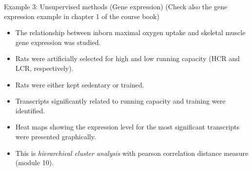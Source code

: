 \documentclass[
  10pt,
  ignorenonframetext,
]{beamer}
\providecommand{\tightlist}{%
  \setlength{\itemsep}{0pt}\setlength{\parskip}{0pt}}
\begin{document}
\begin{frame}{Example 3: Unsupervised methods (Gene expression)}
\protect\hypertarget{example-3-unsupervised-methods-gene-expression}{}
(Check also the gene expression example in chapter 1 of the course book)

\vspace{2mm}

\begin{itemize}
\tightlist
\item
  The relationship between inborn maximal oxygen uptake and skeletal
  muscle gene expression was studied.
\end{itemize}

\vspace{1mm}

\begin{itemize}
\tightlist
\item
  Rats were artificially selected for high and low running capacity (HCR
  and LCR, respectively).
\end{itemize}

\vspace{1mm}

\begin{itemize}
\tightlist
\item
  Rats were either kept sedentary or trained.
\end{itemize}

\vspace{1mm}

\begin{itemize}
\tightlist
\item
  Transcripts significantly related to running capacity and training
  were identified.
\end{itemize}

\vspace{1mm}

\begin{itemize}
\tightlist
\item
  Heat maps showing the expression level for the most significant
  transcripts were presented graphically.
\end{itemize}

\vspace{1mm}

\begin{itemize}
\tightlist
\item
  This is \emph{hierarchical cluster analysis} with pearson correlation
  distance measure (module 10).
\end{itemize}
\end{frame}
\end{document}
